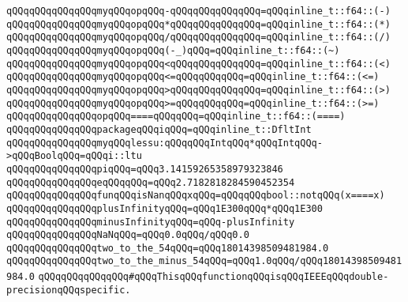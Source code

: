 \verb|qQQqqQQqqQQqqQQqmyqQQqopqQQq-qQQqqQQqqQQqqQQq=qQQqinline_t::f64::(-)|\newline
\verb|qQQqqQQqqQQqqQQqmyqQQqopqQQq*qQQqqQQqqQQqqQQq=qQQqinline_t::f64::(*)|\newline
\verb|qQQqqQQqqQQqqQQqmyqQQqopqQQq/qQQqqQQqqQQqqQQq=qQQqinline_t::f64::(/)|\newline
\verb|qQQqqQQqqQQqqQQqmyqQQqopqQQq(-_)qQQq=qQQqinline_t::f64::(~)|\newline
\verb|qQQqqQQqqQQqqQQqmyqQQqopqQQq<qQQqqQQqqQQqqQQq=qQQqinline_t::f64::(<)|\newline
\verb|qQQqqQQqqQQqqQQqmyqQQqopqQQq<=qQQqqQQqqQQq=qQQqinline_t::f64::(<=)|\newline
\verb|qQQqqQQqqQQqqQQqmyqQQqopqQQq>qQQqqQQqqQQqqQQq=qQQqinline_t::f64::(>)|\newline
\verb|qQQqqQQqqQQqqQQqmyqQQqopqQQq>=qQQqqQQqqQQq=qQQqinline_t::f64::(>=)|\newline
\verb|qQQqqQQqqQQqqQQqopqQQq====qQQqqQQq=qQQqinline_t::f64::(====)|\newline
\newline
\newline
\verb|qQQqqQQqqQQqqQQqpackageqQQqiqQQq=qQQqinline_t::DfltInt|\newline
\verb|qQQqqQQqqQQqqQQqmyqQQqlessu:qQQqqQQqIntqQQq*qQQqIntqQQq->qQQqBoolqQQq=qQQqi::ltu|\newline
\newline
\verb|qQQqqQQqqQQqqQQqpiqQQq=qQQq3.14159265358979323846|\newline
\verb|qQQqqQQqqQQqqQQqeqQQqqQQq=qQQq2.7182818284590452354|\newline
\newline
\verb|qQQqqQQqqQQqqQQqfunqQQqisNanqQQqxqQQq=qQQqqQQqbool::notqQQq(x====x)|\newline
\verb|qQQqqQQqqQQqqQQqplusInfinityqQQq=qQQq1E300qQQq*qQQq1E300|\newline
\verb|qQQqqQQqqQQqqQQqminusInfinityqQQq=qQQq-plusInfinity|\newline
\verb|qQQqqQQqqQQqqQQqNaNqQQq=qQQq0.0qQQq/qQQq0.0|\newline
\newline
\verb|qQQqqQQqqQQqqQQqtwo_to_the_54qQQq=qQQq18014398509481984.0|\newline
\verb|qQQqqQQqqQQqqQQqtwo_to_the_minus_54qQQq=qQQq1.0qQQq/qQQq18014398509481984.0|\newline
\newline
\verb|qQQqqQQqqQQqqQQq#qQQqThisqQQqfunctionqQQqisqQQqIEEEqQQqdouble-precisionqQQqspecific.|\newline
